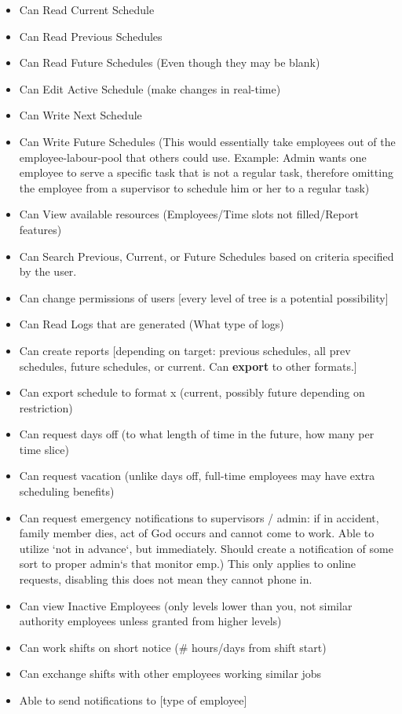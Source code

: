 \documentclass[letterpaper,12pt]{report}
\begin{document}
\begin{itemize}
 \item Can Read Current Schedule
 \item Can Read Previous Schedules
 \item Can Read Future Schedules (Even though they may be blank)
 \item Can Edit Active Schedule (make changes in real-time)
 \item Can Write Next Schedule
 \item Can Write Future Schedules (This would essentially take employees out of the employee-labour-pool that others could use. Example: Admin wants one employee to serve a specific task that is not a regular task, therefore omitting the employee from a supervisor to schedule him or her to a regular task)
 \item Can View available resources (Employees/Time slots not filled/Report features)
 \item Can Search Previous, Current, or Future Schedules based on criteria specified by the user.
 \item Can change permissions of users [every level of tree is a potential possibility]
 \item Can Read Logs that are generated (What type of logs)
 \item Can create reports [depending on target: previous schedules, all prev schedules, future schedules, or current. Can \textbf{export} to other formats.] 
 \item Can export schedule to format x (current, possibly future depending on restriction)
 \item Can request days off (to what length of time in the future, how many per time slice)
 \item Can request vacation (unlike days off, full-time employees may have extra scheduling benefits)
 \item Can request emergency notifications to supervisors / admin: if in accident, family member dies, act of God occurs and cannot come to work. Able to utilize `not in advance`, but immediately. Should create a notification of some sort to proper admin`s that monitor emp.) This only applies to online requests, disabling this does not mean they cannot phone in.
 \item Can view Inactive Employees (only levels lower than you, not similar authority employees unless granted from higher levels)
 \item Can work shifts on short notice (\# hours/days from shift start)
 \item Can exchange shifts with other employees working similar jobs
 \item Able to send notifications to [type of employee]
\end{itemize}
\end{document}
